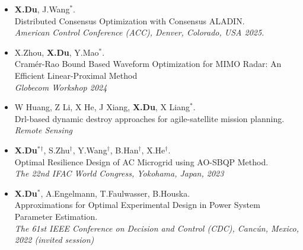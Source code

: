 \documentclass[paper=a4,fontsize=11pt]{scrartcl} %
\begin{document}
\begin{itemize}
		\item  {\textbf{X.Du}, J.Wang$^*$. \\
		{ Distributed Consensus Optimization with Consensus ALADIN.}\\
		\emph{American Control Conference (ACC), Denver, Colorado, USA 2025.
	} }
		\item  {X.Zhou, \textbf{X.Du},   Y.Mao$^*$. \\
		{Cram\'er-Rao Bound Based Waveform Optimization for MIMO Radar: An Efficient Linear-Proximal Method}\\
		\emph{Globecom Workshop 2024
	} }
	
%	
	\item  {W Huang, Z Li, X He, J Xiang, \textbf{X.Du}, X Liang$^*$. \\
	{Drl-based dynamic destroy approaches for agile-satellite mission planning.}\\
	\emph{Remote Sensing
} }
		\item  {\textbf{X.Du}$^*$$^{\dag}$, S.Zhu$^{\dag}$, Y.Wang$^{\dag}$, B.Han$^{\dag}$, X.He$^{\dag}$. \\
		{Optimal Resilience Design of AC Microgrid using AO-SBQP Method.}\\
		\emph{The 22nd IFAC World Congress, Yokohama, Japan, 2023
	} }
	
		\item  { \textbf{X.Du}$^*$, A.Engelmann, T.Faulwasser, B.Houska. \\
		{Approximations for Optimal Experimental Design
			in Power System Parameter Estimation. }\\
		\emph{ The 61st IEEE Conference on Decision and Control (CDC), Canc\'un, Mexico, 2022 (invited session)
		} }
	

\end{itemize}
\end{document}
